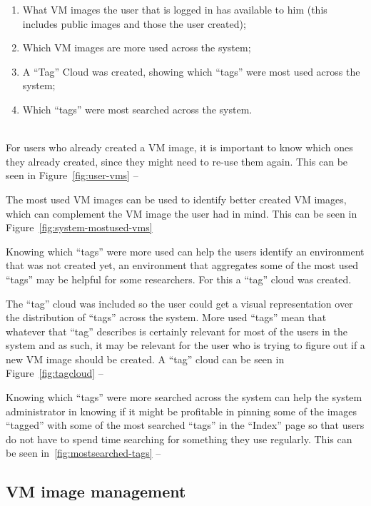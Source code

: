 \begin{enumerate}
\item What VM images the user that is logged in has available to him (this includes public images and those the user created);
\item Which VM images are more used across the system;
\item A ``Tag'' Cloud was created, showing which ``tags'' were most used across the system;
\item Which ``tags'' were most searched across the system.
\end{enumerate}

\ \\
For users who already created a VM image, it is important to know which ones they already created, since they might need to re-use them again.
This can be seen in Figure~\ref{fig:user-vms} --~

The most used VM images can be used to identify better created VM images, which can complement the VM image the user had in mind.
This can be seen in Figure~\ref{fig:system-mostused-vms}

Knowing which ``tags'' were more used can help the users identify an environment that was not created yet, an environment that aggregates some of the most used ``tags'' may be helpful for some researchers. For this a ``tag'' cloud was created.

The ``tag'' cloud was included so the user could get a visual representation over the distribution of ``tags'' across the system. More used ``tags'' mean that whatever that ``tag'' describes is certainly relevant for most of the users in the system and as such, it may be relevant for the user who is trying to figure out if a new VM image should be created.
A ``tag'' cloud can be seen in Figure~\ref{fig:tagcloud} --~

Knowing which ``tags'' were more searched across the system can help the system administrator in knowing if it might be profitable in pinning some of the images ``tagged'' with some of the most searched ``tags'' in the ``Index'' page so that users do not have to spend time searching for something they use regularly.
This can be seen in~\ref{fig:mostsearched-tags} --~

\subsection{VM image management}\label{subsec:vm-manag}

